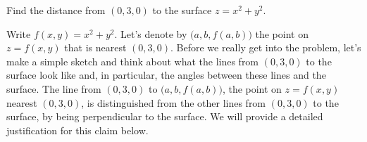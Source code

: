 \begin{eg}[Optional]\label{eg tan plane B}
Find the distance from $(0,3,0)$ 
to the surface $z=x^2+y^2$. 

\soln
Write $f(x,y)=x^2+y^2$. Let's denote  by $\big(a,b,f(a,b)\big)$ the point on $z=f(x,y)$ that is nearest $(0,3,0)$.
Before we really get into the problem, let's make a simple sketch and think about what the lines from $(0,3,0)$ to the surface look like and, in 
particular, the angles between these lines and the surface.
The line from $(0,3,0)$ to $\big(a,b,f(a,b)\big)$,
the point on $z=f(x,y)$ nearest $(0,3,0)$, 
is distinguished from the other lines from $(0,3,0)$ to the 
surface, by being perpendicular to the surface.
We will provide a detailed justification for this claim below. 



\end{eg}

